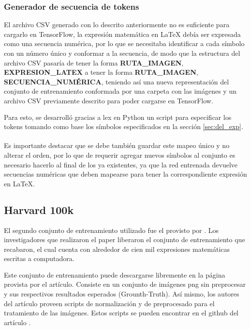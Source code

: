 \subsubsection{Generador de secuencia de tokens}
El archivo CSV generado con lo descrito anteriormente no es suficiente para cargarlo en TensorFlow, la expresión matemática en \LaTeX{} debía ser expresada como una secuencia numérica, por lo que se necesitaba identificar a cada símbolo con un número único y conformar a la secuencia, de modo que la estructura del archivo CSV pasaría de tener la forma \textbf{RUTA\_IMAGEN}, \textbf{EXPRESION\_LATEX} a tener la forma \textbf{RUTA\_IMAGEN}, \textbf{SECUENCIA\_NUMÉRICA}, teniendo así una nueva representación del conjunto de entrenamiento conformada por una carpeta con las imágenes y un archivo CSV previamente descrito para poder cargarse en TensorFlow.

Para esto, se desarrolló gracias a lex en Python un script para especificar los tokens tomando como base los símbolos especificados en la sección \ref{sec:del_exp}.\\\\






\vspace{1em}
Es importante destacar que se debe también guardar este mapeo único y no alterar el orden, por lo que de requerir agregar nuevos símbolos al conjunto es necesario hacerlo al final de los ya existentes, ya que la red entrenada devuelve secuencias numéricas que deben mapearse para tener la correspondiente expresión en \LaTeX{}.

\subsection{Harvard 100k}

El segundo conjunto de entrenamiento utilizado fue el provisto por \cite{harvard}. Los investigadores que realizaron el paper liberaron el conjunto de entrenamiento que recabaron, el cual cuenta con alrededor de cien mil expresiones matemáticas escritas a computadora.

Este conjunto de entrenamiento puede descargarse libremente en la página provista por el artículo. Consiste en un conjunto de imágenes png sin preprocesar y sus respectivos resultados esperados (Grounth-Truth). Así mismo, los autores del artículo proveen scripts de normalización y de preprocesado para el tratamiento de las imágenes. Estos scripts se pueden encontrar en el github del artículo \cite{harvard-scripts}.

